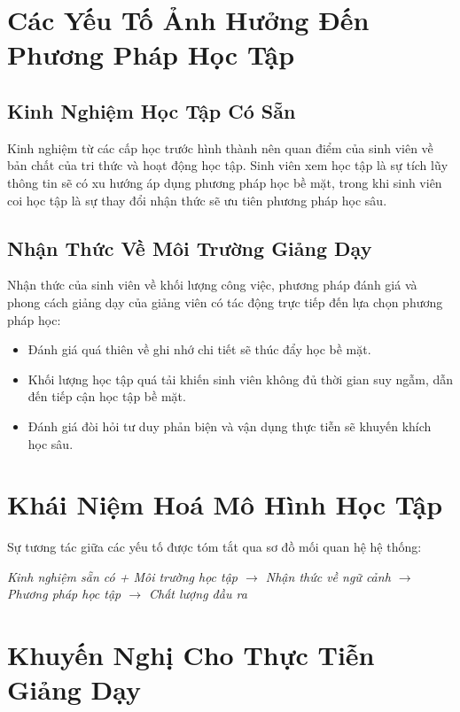 \documentclass[12pt,a4paper]{article}
\begin{document}
\section{Các Yếu Tố Ảnh Hưởng Đến Phương Pháp Học Tập}

\subsection{Kinh Nghiệm Học Tập Có Sẵn}
Kinh nghiệm từ các cấp học trước hình thành nên quan điểm của sinh viên về bản chất của tri thức và hoạt động học tập. Sinh viên xem học tập là sự tích lũy thông tin sẽ có xu hướng áp dụng phương pháp học bề mặt, trong khi sinh viên coi học tập là sự thay đổi nhận thức sẽ ưu tiên phương pháp học sâu.

\subsection{Nhận Thức Về Môi Trường Giảng Dạy}
Nhận thức của sinh viên về khối lượng công việc, phương pháp đánh giá và phong cách giảng dạy của giảng viên có tác động trực tiếp đến lựa chọn phương pháp học:
\begin{itemize}
    \item Đánh giá quá thiên về ghi nhớ chi tiết sẽ thúc đẩy học bề mặt.
    \item Khối lượng học tập quá tải khiến sinh viên không đủ thời gian suy ngẫm, dẫn đến tiếp cận học tập bề mặt.
    \item Đánh giá đòi hỏi tư duy phản biện và vận dụng thực tiễn sẽ khuyến khích học sâu.
\end{itemize}

\section{Khái Niệm Hoá Mô Hình Học Tập}

Sự tương tác giữa các yếu tố được tóm tắt qua sơ đồ mối quan hệ hệ thống:
\begin{center}
\textit{Kinh nghiệm sẵn có + Môi trường học tập $\longrightarrow$ Nhận thức về ngữ cảnh $\longrightarrow$ Phương pháp học tập $\longrightarrow$ Chất lượng đầu ra}
\end{center}

\section{Khuyến Nghị Cho Thực Tiễn Giảng Dạy}
\end{document}
